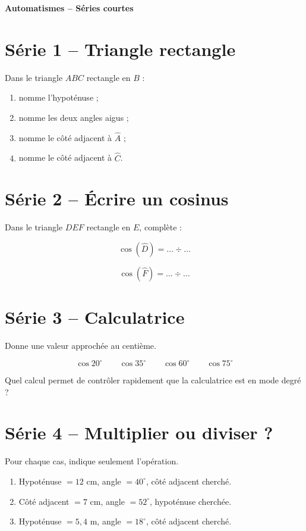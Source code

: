 \documentclass[12pt,a4paper]{article}
\newcommand{\titreseq}[1]{%
\begin{center}
{\sffamily\large\bfseries\color{SavoirC}#1}
\end{center}}
\begin{document}
\titreseq{Automatismes -- Séries courtes}

\section*{Série 1 -- Triangle rectangle}

Dans le triangle \(ABC\) rectangle en \(B\) :

\begin{enumerate}
  \item nomme l'hypoténuse ;
  \item nomme les deux angles aigus ;
  \item nomme le côté adjacent à \(\widehat A\) ;
  \item nomme le côté adjacent à \(\widehat C\).
\end{enumerate}

\section*{Série 2 -- Écrire un cosinus}

Dans le triangle \(DEF\) rectangle en \(E\), complète :

\[
\cos(\widehat D)=\ldots\div\ldots
\]

\[
\cos(\widehat F)=\ldots\div\ldots
\]

\section*{Série 3 -- Calculatrice}

Donne une valeur approchée au centième.

\[
\cos 20^\circ
\qquad
\cos 35^\circ
\qquad
\cos 60^\circ
\qquad
\cos 75^\circ
\]

Quel calcul permet de contrôler rapidement que la calculatrice est en mode degré ?

\section*{Série 4 -- Multiplier ou diviser ?}

Pour chaque cas, indique seulement l'opération.

\begin{enumerate}
  \item Hypoténuse \(=12\) cm, angle \(=40^\circ\), côté adjacent cherché.
  \item Côté adjacent \(=7\) cm, angle \(=52^\circ\), hypoténuse cherchée.
  \item Hypoténuse \(=5{,}4\) m, angle \(=18^\circ\), côté adjacent cherché.
\end{enumerate}
\end{document}
